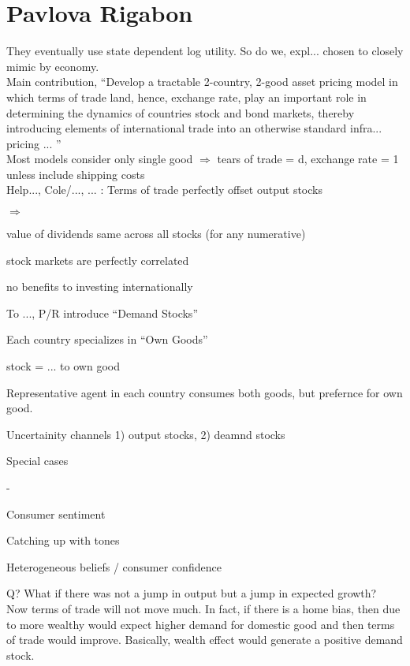 \documentclass[]{article}
\begin{document}
\section*{Pavlova Rigabon}
They eventually use state dependent log utility. So do we, expl... chosen to closely mimic by economy.\\

Main contribution, ``Develop a tractable 2-country, 2-good asset pricing model in which terms of trade land, hence, exchange rate, play an important role in determining the dynamics of countries stock and bond markets, thereby introducing elements of international trade into an otherwise standard infra... pricing ... ''\\

Most models consider only single good $\Rightarrow $ tears of trade = d, exchange rate = 1 unless include shipping costs\\

Help..., Cole/..., ... : Terms of trade perfectly offset output stocks
\begin{list}{$\Rightarrow $}{}
\item value of dividends same across all stocks (for any numerative)
\item stock markets are perfectly correlated
\item no benefits to investing internationally
\item To ..., P/R introduce ``Demand Stocks''
\item Each country specializes in ``Own Goods''
\item stock = ... to own good
\item Representative agent in each country consumes both goods, but prefernce for own good.
\item Uncertainity channels 1) output stocks, 2) deamnd stocks
\end{list}

Special cases
\begin{list}{-}{}
\item Consumer sentiment
\item Catching up with tones
\item Heterogeneous beliefs / consumer confidence
\end{list}

Q? What if there was not a jump in output but a jump in expected growth?\\
Now terms of trade will not move much. In fact, if there is a home bias, then due to more wealthy would expect higher demand for domestic good and then terms of trade would improve. Basically, wealth effect would generate a positive demand stock.\\
\end{document}
